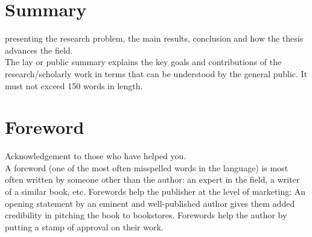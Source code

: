 \chapter*{Summary}
   presenting the research problem, the main results, conclusion and how the thesis 
  advances the field. \\
  The lay or public summary explains the key goals and contributions of the research/scholarly work 
  in terms that can be understood by the general public. It must not exceed 150 words in length.

\chapter*{Foreword}
  Acknowledgement to those who have helped you. \\
  A foreword (one of the most often misspelled words in the language) is most often written by 
    someone other than the author: an expert in the field, a writer of a similar book, etc. 
    Forewords help the publisher at the level of marketing: An opening statement by an eminent and 
    well-published author gives them added credibility in pitching the book to bookstores. Forewords 
    help the author by putting a stamp of approval on their work.

